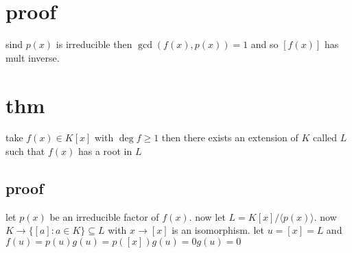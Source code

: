 \documentclass[letterpaper]{article}
\begin{document}
\section*{proof}
sind $p(x)$ is irreducible then $\gcd(f(x),p(x))=1$ and so $[f(x)]$ has mult inverse.

\section*{thm}
take $f(x)\in K[x]$ with $\deg f\ge 1$ then there exists an extension of $K$ called $L$ such that $f(x)$ has a root in $L$
\subsection*{proof}
let $p(x)$ be an irreducible factor of $f(x)$. now let $L=K[x]/\langle p(x)\rangle$. now $K\to \{[a]:a\in K\}\subseteq L$ with $x\to[x]$ is an isomorphism. let $u=[x]=L$ and $f(u)=p(u)g(u)=p([x])g(u)=0g(u)=0$
\end{document}
